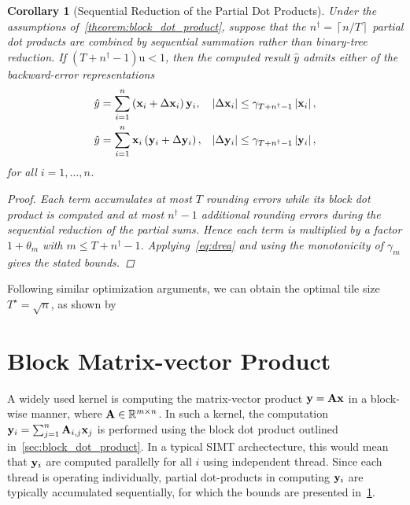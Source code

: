 \documentclass[11pt,draft]{article}
\newcommand{\urd}{\ensuremath{\mathrm{u}}}
\newcommand{\vect}[1]{\mathbf{\MakeLowercase{#1}}}
\newcommand{\mat}[1]{\mathbf{\MakeUppercase{#1}}}
\newcommand{\ireal}[1]{\in\mathbb{R}^{#1}}
\newtheorem{corollary}[theorem]{Corollary}
\theoremstyle{definition}
\theoremstyle{remark}
\newcommand{\abs}[1]{\left|#1\right|}
\newcommand{\ceil}[1]{\left\lceil #1 \right\rceil}
\begin{document}
\begin{corollary}[Sequential Reduction of the Partial Dot Products]
\label{corollary:block_dot_product_sequential}
Under the assumptions of~\cref{theorem:block_dot_product}, suppose that
the $n^\dagger=\ceil{n/T}$ partial dot products are combined by sequential
summation rather than binary-tree reduction. If
$(T+n^\dagger-1)\urd<1$, then the computed result $\hat{y}$ admits either
of the backward-error representations
\begin{align}
    \hat{y}
    &=\sum_{i=1}^{n}
      \left(\vect{x}_i+\Delta\vect{x}_i\right)\vect{y}_i,
    &
    \abs{\Delta\vect{x}_i}
    &\leq \gamma_{T+n^\dagger-1}\abs{\vect{x}_i},
    \\
    \hat{y}
    &=\sum_{i=1}^{n}
      \vect{x}_i\left(\vect{y}_i+\Delta\vect{y}_i\right),
    &
    \abs{\Delta\vect{y}_i}
    &\leq \gamma_{T+n^\dagger-1}\abs{\vect{y}_i},
\end{align}
for all $i=1,\ldots,n$.
\begin{proof}
Each term accumulates at most $T$ rounding errors while its block dot
product is computed and at most $n^\dagger-1$ additional rounding errors
during the sequential reduction of the partial sums. Hence each term is
multiplied by a factor $1+\theta_m$ with
$m\leq T+n^\dagger-1$. Applying~\cref{eq:drea} and using the monotonicity
of $\gamma_m$ gives the stated bounds.
\end{proof}
\end{corollary}

Following similar optimization arguments, we can obtain the optimal tile size $T^\star = \sqrt{n}$, as shown by~\cite[p. 64]{higham2002accuracy}

\section{Block Matrix-vector Product}
A widely used kernel is computing the matrix-vector product $\vect{y} = \mat{a}\vect{x}$ in a block-wise manner, where $\mat{a}\ireal{m\times n}$.
In such a kernel, the computation $\vect{y}_i = \sum_{j=1}^n \mat{a}_{i,j} \vect{x}_j$ is performed using the block dot product outlined in~\cref{sec:block_dot_product}.
In a typical SIMT archectecture, this would mean that $\vect{y}_i$ are computed parallelly for all $i$ using independent thread.
Since each thread is operating individually, partial dot-products in computing $\vect{y}_i$ are typically accumulated sequentially, for which the bounds are presented in~\cref{corollary:block_dot_product_sequential}.
\end{document}
